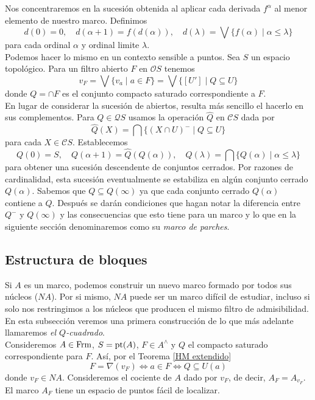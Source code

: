 Nos concentraremos en la sucesión obtenida al aplicar cada derivada $f^\alpha$ al menor elemento de nuestro marco. Definimos
\[
d(0)=0,\quad d(\alpha +1)=f(d(\alpha)), \quad d(\lambda)=\bigvee\{f(\alpha)\mid \alpha\leq \lambda\}
\]
para cada ordinal $\alpha$ y ordinal limite $\lambda$.\\

Podemos hacer lo mismo en un contexto sensible a puntos. Sea $S$ un espacio topológico. Para un filtro abierto $F$ en $\mathcal{O}S$ tenemos 
\[
v_F=\bigvee\{v_a\mid a\in F\}=\bigvee\{[U']\mid Q\subseteq U\}
\]
donde $Q=\cap F$ es el conjunto compacto saturado correspondiente a $F$.\\

En lugar de considerar la sucesión de abiertos, resulta más sencillo el hacerlo en sus complementos. Para $Q\in \mathcal{Q}S$ usamos la operación $\hat{Q}$ en $\mathcal{C}S$ dada por 
\[
\hat{Q}(X)=\bigcap\{(X\cap U)^-\mid Q\subseteq U\}
\]
para cada $X\in \mathcal{C}S$. Establecemos
\[
Q(0)=S,\quad Q(\alpha +1)=\hat{Q}(Q(\alpha)), \quad Q(\lambda)=\bigcap\{Q(\alpha)\mid \alpha\leq \lambda\}
\]
para obtener una sucesión descendente de conjuntos cerrados. Por razones de cardinalidad, esta sucesión eventualmente se estabiliza en algún conjunto cerrado $Q(\alpha)$. Sabemos que $Q\subseteq Q(\infty)$ ya que cada conjunto cerrado $Q(\alpha)$ contiene a $Q$. 
Después se darán condiciones que hagan notar la diferencia entre $Q^-$ y $Q(\infty)$ y las consecuencias que esto tiene para un marco y lo que en la siguiente sección denominaremos como su \emph{marco de parches}.

\subsection{Estructura de bloques}\label{Estructura de bloques}

Si $A$ es un marco, podemos construir un nuevo marco formado por todos sus núcleos ($NA$). Por si mismo, $NA$ puede ser un marco difícil de estudiar, incluso si solo nos restringimos a los núcleos que producen el mismo filtro de admisibilidad.\\

En esta subsección veremos una primera construcción de lo que más adelante llamaremos \emph{el $Q$-cuadrado}.\\

Consideremos $A\in \mathrm{Frm}$, $S=\mathrm{pt}(A)$, $F\in A^\wedge$ y $Q$ el compacto saturado correspondiente para $F$. Así, por el Teorema \ref{HM extendido}
\[
F=\nabla(v_F)\Leftrightarrow a\in F\Leftrightarrow Q\subseteq U(a)
\]
donde $v_F\in NA$. Consideremos el cociente de $A$ dado por $v_F$, de decir, $A_F=A_{v_F}$. El marco $A_F$ tiene un espacio de puntos fácil de localizar.

